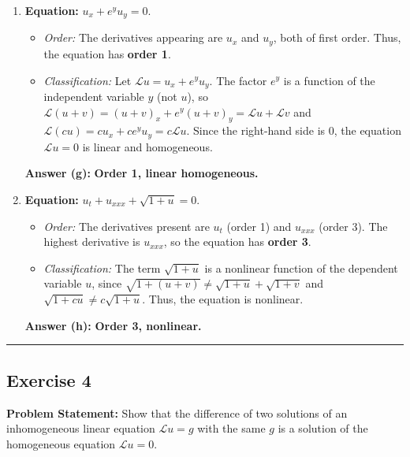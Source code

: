 \documentclass[11pt,a4paper]{article}
\begin{document}
\begin{enumerate}[label=(\alph*)]
    \item \textbf{Equation:} $u_x + e^y u_y = 0$.
    \begin{itemize}
        \item \emph{Order:} The derivatives appearing are $u_x$ and $u_y$, both of first order. Thus, the equation has \textbf{order 1}.
        \item \emph{Classification:} Let $\mathcal{L}u = u_x + e^y u_y$. The factor $e^y$ is a function of the independent variable $y$ (not $u$), so $\mathcal{L}(u+v) = (u+v)_x + e^y(u+v)_y = \mathcal{L}u + \mathcal{L}v$ and $\mathcal{L}(cu) = c u_x + c e^y u_y = c\mathcal{L}u$. Since the right-hand side is $0$, the equation $\mathcal{L}u = 0$ is linear and homogeneous.
    \end{itemize}
    \textbf{Answer (g):} \textbf{Order 1, linear homogeneous.}

    \item \textbf{Equation:} $u_t + u_{xxx} + \sqrt{1 + u} = 0$.
    \begin{itemize}
        \item \emph{Order:} The derivatives present are $u_t$ (order 1) and $u_{xxx}$ (order 3). The highest derivative is $u_{xxx}$, so the equation has \textbf{order 3}.
        \item \emph{Classification:} The term $\sqrt{1 + u}$ is a nonlinear function of the dependent variable $u$, since $\sqrt{1 + (u + v)} \neq \sqrt{1 + u} + \sqrt{1 + v}$ and $\sqrt{1 + cu} \neq c\sqrt{1 + u}$. Thus, the equation is nonlinear.
    \end{itemize}
    \textbf{Answer (h):} \textbf{Order 3, nonlinear.}
\end{enumerate}

\bigskip
\hrule
\bigskip

\subsection*{Exercise 4}
\textbf{Problem Statement:} Show that the difference of two solutions of an inhomogeneous linear equation $\mathcal{L}u = g$ with the same $g$ is a solution of the homogeneous equation $\mathcal{L}u = 0$.
\end{document}
